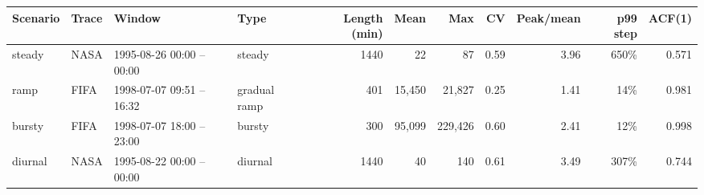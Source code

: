 \begin{tabular}{llllrrrrrrr}
\toprule
Scenario & Trace & Window & Type & Length (min) & Mean & Max & CV & Peak/mean & p99 step & ACF(1) \\
\midrule
steady & NASA & 1995-08-26 00:00 -- 00:00 & steady & 1440 & 22 & 87 & 0.59 & 3.96 & 650\% & 0.571 \\
ramp & FIFA & 1998-07-07 09:51 -- 16:32 & gradual ramp & 401 & 15,450 & 21,827 & 0.25 & 1.41 & 14\% & 0.981 \\
bursty & FIFA & 1998-07-07 18:00 -- 23:00 & bursty & 300 & 95,099 & 229,426 & 0.60 & 2.41 & 12\% & 0.998 \\
diurnal & NASA & 1995-08-22 00:00 -- 00:00 & diurnal & 1440 & 40 & 140 & 0.61 & 3.49 & 307\% & 0.744 \\
\bottomrule
\end{tabular}
